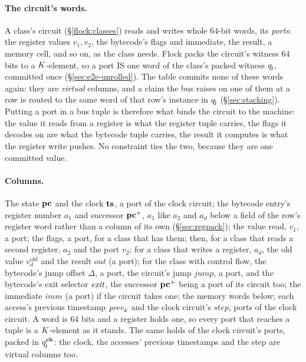 \paragraph{The circuit's words.} A class's circuit (\S\ref{flock:classes}) reads and writes whole $64$-bit words, its \emph{ports}: the register values $v_1,v_2$, the bytecode's flags and immediate, the result, a memory cell, and so on, as the class needs. Flock packs the circuit's witness $64$ bits to a $K$-element, so a port IS one word of the class's packed witness $q_{\mathsf{j}}$, committed once (\S\ref{sec:e2e-unrolled}). The table commits none of these words again: they are \emph{virtual} columns, and a claim the bus raises on one of them at a row is routed to the same word of that row's instance in $q_{\mathsf{j}}$ (\S\ref{sec:stacking}). Putting a port in a bus tuple is therefore what binds the circuit to the machine: the value it reads from a register is what the register tuple carries, the flags it decodes on are what the bytecode tuple carries, the result it computes is what the register write pushes. No constraint ties the two, because they are one committed value.

\paragraph{Columns.} The state $\mathbf{pc}$ and the clock $\mathbf{ts}$, a port of the clock circuit; the bytecode entry's register number $a_1$ and successor $\mathbf{pc}^{+}$, $a_1$ like $a_2$ and $a_d$ below a field of the row's register word rather than a column of its own (\S\ref{sec:regpack}); the value read, $v_1$, a port; the flags, a port, for a class that has them; then, for a class that reads a second register, $a_2$ and the port $v_2$; for a class that writes a register, $a_d$, the old value $v_d^{\mathrm{old}}$ and the result $\mathit{out}$ (a port); for the class with control flow, the bytecode's jump offset $\Delta$, a port, the circuit's jump $\mathit{jump}$, a port, and the bytecode's exit selector $\mathit{exit}$, the successor $\mathbf{pc}^{+}$ being a port of its circuit too; the immediate $\mathit{imm}$ (a port) if the circuit takes one; the memory words below; each access's previous timestamp $\mathit{prev}_k$ and the clock circuit's $\mathit{step}$, ports of the clock circuit. A word is $64$ bits and a register holds one, so every port that reaches a tuple is a $K$-element as it stands. The same holds of the clock circuit's ports, packed in $q^{\mathsf{clk}}_{\mathsf{j}}$: the clock, the accesses' previous timestamps and the step are virtual columns too.

